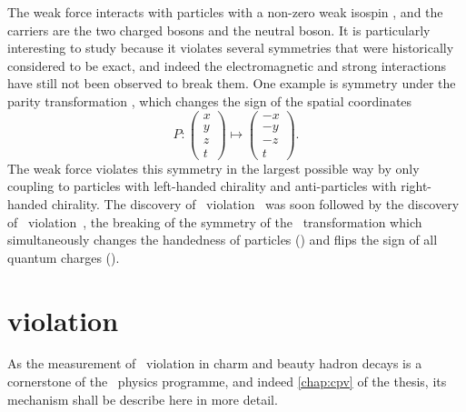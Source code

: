 The weak force interacts with particles with a non-zero weak isospin \wisospin, 
and the carriers are the two charged \PWpm bosons and the neutral \PZ boson.
It is particularly interesting to study because it violates several symmetries 
that were historically considered to be exact, and indeed the electromagnetic 
and strong interactions have still not been observed to break them.
One example is symmetry under the parity transformation \Ptransform, which 
changes the sign of the spatial coordinates
\begin{equation}
  P: \begin{pmatrix}x\\y\\z\\t\end{pmatrix}
     \mapsto \begin{pmatrix}-x\\-y\\-z\\t\end{pmatrix}.
  \label{eqn:intro:sm:parity}
\end{equation}
The weak force violates this symmetry in the largest possible way by only 
coupling to particles with left-handed chirality and anti-particles with 
right-handed chirality.
The discovery of \Ptransform\ violation~\cite{Wu:1957my} was soon followed by 
the discovery of \CP\ violation~\cite{Christenson:1964fg}, the breaking of the 
symmetry of the \CP\ transformation which simultaneously changes the handedness 
of particles (\Ptransform) and flips the sign of all quantum charges 
(\Ctransform).

\section{\texorpdfstring{\CP}{CP} violation}
\label{chap:intro:sm:cp}

As the measurement of \CP\ violation in charm and beauty hadron decays is a 
cornerstone of the \lhcb\ physics programme, and indeed \cref{chap:cpv} of the 
thesis, its mechanism shall be describe here in more detail.

